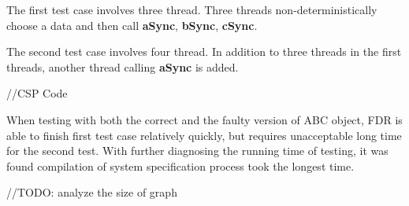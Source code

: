 \documentclass{article}
\begin{document}
The first test case involves three thread. Three threads non-deterministically choose a data and then call \textbf{aSync}, \textbf{bSync}, \textbf{cSync}.

The second test case involves four thread. In addition to three threads in the first threads, another thread calling \textbf{aSync} is added.

//CSP Code

When testing with both the correct and the faulty version of ABC object, FDR is able to finish first test case relatively quickly, but requires unacceptable long time for the second test. With further diagnosing the running time of testing, it was found compilation of system specification process took the longest time. 

//TODO: analyze the size of graph
\end{document}
